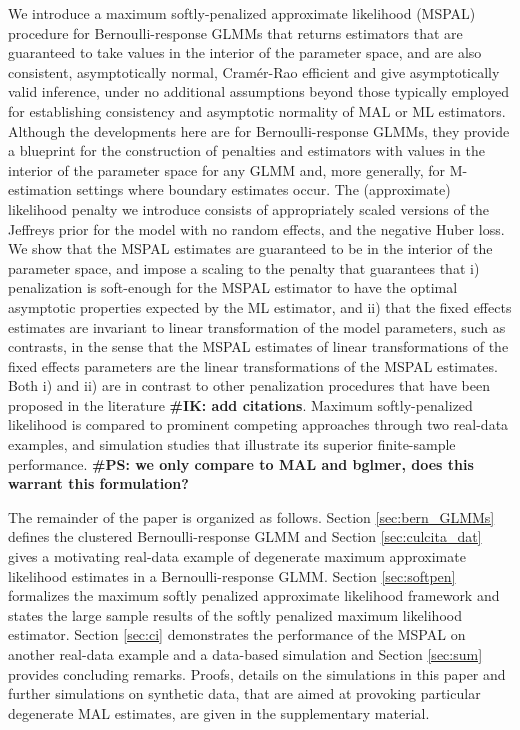 \documentclass[11pt, a4paper]{article}
\newcommand{\IK}[1]{{\noindent \color{blue} \bf \#IK: #1}}
\newcommand{\PS}[1]{{\noindent \color{red} \bf \#PS: #1}}
\theoremstyle{example} \newtheorem{example}{Example}[section]
\theoremstyle{theorem} \newtheorem{theorem}{Theorem}[section]
\begin{document}
We introduce a maximum softly-penalized approximate likelihood (MSPAL)
procedure for Bernoulli-response GLMMs that returns estimators that
are guaranteed to take values in the interior of the parameter space,
and are also consistent, asymptotically normal, Cram\'{e}r-Rao
efficient and give asymptotically valid inference, under no additional assumptions beyond those typically
employed for establishing consistency and asymptotic normality of MAL
or ML estimators. Although the developments here are for
Bernoulli-response GLMMs, they provide a blueprint for the
construction of penalties and estimators with values in the interior
of the parameter space for any GLMM and, more generally, for
M-estimation settings where boundary estimates occur. The
(approximate) likelihood penalty we introduce consists of
appropriately scaled versions of the Jeffreys prior for the model with
no random effects, and the negative Huber loss. We show that the MSPAL
estimates are guaranteed to be in the interior of the parameter space,
and impose a scaling to the penalty
that guarantees that i) penalization is soft-enough for the MSPAL
estimator to have the optimal asymptotic properties expected by the ML
estimator, and ii) that the fixed effects estimates are invariant to linear
transformation of the model parameters, such as contrasts, in the
sense that the MSPAL estimates of linear transformations of the fixed
effects parameters are the linear transformations of the MSPAL
estimates. Both i) and ii) are in contrast to other penalization
procedures that have been proposed in the literature \citep[see, for
example,][]{chung+etal:2013, chung+etal:2015} \IK{add citations}. Maximum
softly-penalized likelihood is compared to prominent competing
approaches through two real-data examples, and
simulation studies that illustrate its superior finite-sample
performance. \PS{we only compare to MAL and bglmer, does this warrant this formulation?}

The remainder of the paper is organized as follows. Section \ref{sec:bern_GLMMs} defines the clustered
Bernoulli-response GLMM and Section \ref{sec:culcita_dat} gives a motivating real-data example of
degenerate maximum approximate likelihood estimates in a Bernoulli-response GLMM. Section
\ref{sec:softpen} formalizes the maximum softly penalized approximate likelihood framework and
states the large sample results of the softly penalized maximum
likelihood estimator. Section \ref{sec:ci} demonstrates the performance of the MSPAL on another real-data example and a data-based simulation and Section \ref{sec:sum} provides concluding remarks. Proofs, details on the simulations in this paper and further simulations on synthetic data, that are aimed at provoking particular degenerate MAL estimates, are given in the supplementary material. 
\end{document}
